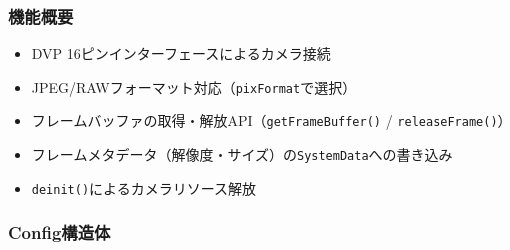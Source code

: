 \subsubsection{機能概要}

\begin{itemize}
    \item DVP 16ピンインターフェースによるカメラ接続
    \item JPEG/RAWフォーマット対応（\texttt{pixFormat}で選択）
    \item フレームバッファの取得・解放API（\texttt{getFrameBuffer()} / \texttt{releaseFrame()}）
    \item フレームメタデータ（解像度・サイズ）の\texttt{SystemData}への書き込み
    \item \texttt{deinit()}によるカメラリソース解放
\end{itemize}

\subsubsection{Config構造体}

